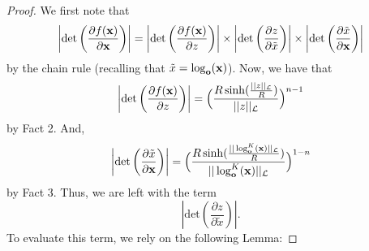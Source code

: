 \begin{proof}
We first note that 
\begin{equation}
\left|\textnormal{det}\left(\frac{\partial f(\mathbf{x})}{\partial \mathbf{x}}\right)\right| = \left|\textrm{det}\left(\frac{\partial f(\mathbf{x})}{\partial z}\right)\right| \times \left|\textrm{det}\left(\frac{\partial z}{\partial \tilde{x}}\right)\right| \times \left|\textrm{det}\left(\frac{\partial \tilde{x}}{\partial \mathbf{x}}\right)\right| 
\end{equation}
by the chain rule (recalling that $\tilde{x} = \log_{\mathbf{o}}(\mathbf{x})$).
Now, we have that 
\begin{equation}
\left|\textrm{det}\left(\frac{\partial f(\mathbf{x})}{\partial z}\right)\right| =
\Big(\frac{R\sinh(\frac{||z||_{\mathcal{L}}}{R})}{||z||_{\mathcal{L}}}\Big)^{n-1}
\end{equation}
by Fact 2.
And, 
\begin{equation}
\left|\textrm{det}\left(\frac{\partial \tilde{x}}{\partial \mathbf{x}}\right)\right| =
\Big(\frac{R\sinh(\frac{||\log^K_{\textbf{o}}(\textbf{x})||_{\mathcal{L}}}{R})}{||\log^K_{\textbf{o}}(\textbf{x})||_{\mathcal{L}}}\Big)^{1-n}
\end{equation}
by Fact 3.
Thus, we are left with the term
$$
\left|\textrm{det}\left(\frac{\partial z}{\partial \tilde{x}}\right)\right|.
$$
To evaluate this term, we rely on the following Lemma:


\end{proof}
